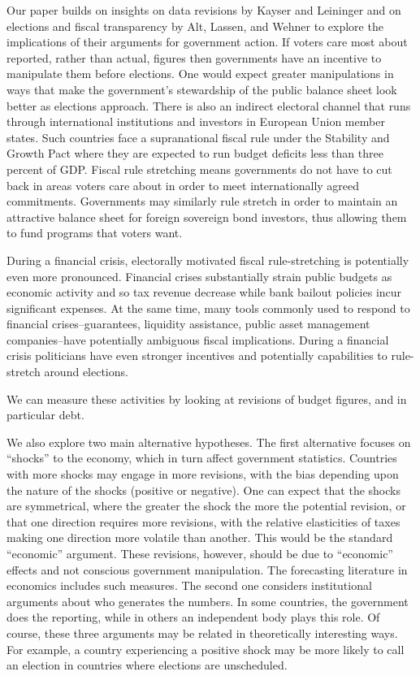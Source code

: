 \documentclass[]{article}
\begin{document}
Our paper builds on insights on data revisions by Kayser and Leininger and on elections and fiscal transparency by Alt, Lassen, and Wehner to explore the implications of their arguments for government action.  If voters care most about reported, rather than actual, figures then governments have an incentive to manipulate them before elections. One would expect greater manipulations in ways that make the government's stewardship of the public balance sheet look better as elections approach. There is also an indirect electoral channel that runs through international institutions and investors in European Union member states. Such countries face a supranational fiscal rule under  the Stability and Growth Pact where they are expected to run budget deficits less than three percent of GDP. Fiscal rule stretching means governments do not have to cut back in areas voters care about in order to meet internationally agreed commitments. Governments may similarly rule stretch in order to maintain an attractive balance sheet for foreign sovereign bond investors, thus allowing them to fund programs that voters want.

During a financial crisis, electorally motivated fiscal rule-stretching is potentially even more pronounced. Financial crises substantially strain public budgets as economic activity and so tax revenue decrease while bank bailout policies incur significant expenses. At the same time, many tools commonly used to respond to financial crises--guarantees, liquidity assistance, public asset management companies--have potentially ambiguous fiscal implications. During a financial crisis politicians have even stronger incentives and potentially capabilities to rule-stretch around elections.

We can measure these activities by looking at revisions of budget figures, and in particular debt.

We also explore two main alternative hypotheses. The first alternative focuses on ``shocks'' to the economy, which in turn affect government statistics. Countries with more shocks may engage in more revisions, with the bias depending upon the nature of the shocks (positive or negative). One can expect that the shocks are symmetrical, where the greater the shock the more the potential revision, or that one direction requires more revisions, with  the relative elasticities of taxes making one direction more volatile than another. This would be the standard ``economic'' argument. These revisions, however, should be due to ``economic'' effects and not conscious government manipulation. The forecasting literature in economics includes such measures. The second one considers institutional arguments about who generates the numbers. In some countries, the government does the reporting, while in others an independent body plays this role. Of course, these three arguments may be related in theoretically interesting ways. For example, a country experiencing a positive shock may be more likely to call an election in countries where elections are unscheduled.
\end{document}
